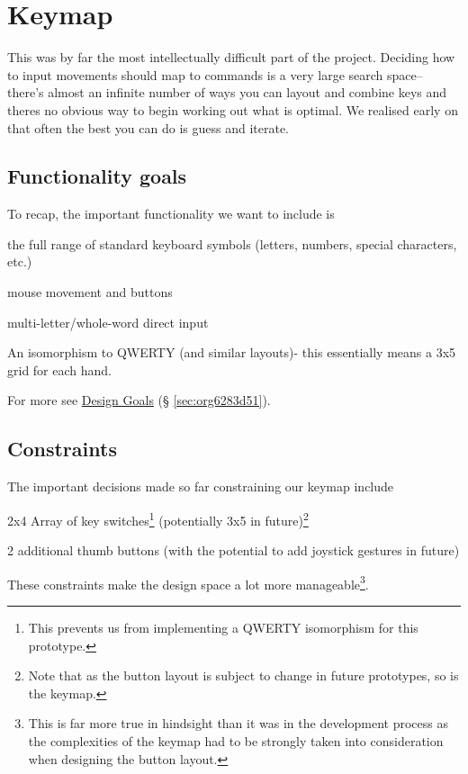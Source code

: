 \documentclass[logo,bsc,singlespacing,parskip]{infthesis}
\begin{document}
\section{Keymap}
\label{sec:org73fc90b}
This was by far the most intellectually difficult part of the project.
Deciding how to input movements should map to commands is a very large search space-- there's almost an infinite number of ways you can layout and combine keys and theres no obvious way to begin working out what is optimal.
We realised early on that often the best you can do is guess and iterate.

\subsection{Functionality goals}
\label{sec:orge45ade3}
To recap, the important functionality we want to include is
\begin{enumerate*}[label={\arabic*)}, itemjoin={, \,}, itemjoin*={, and \,}]
\item the full range of standard keyboard symbols (letters, numbers, special characters, etc.)
\item mouse movement and buttons
\item multi-letter/whole-word direct input
\item An isomorphism to QWERTY (and similar layouts)- this essentially means a 3x5 grid for each hand.
\end{enumerate*}
For more see \hyperref[sec:org6283d51]{Design Goals} (§ \ref{sec:org6283d51}).

\subsection{Constraints}
\label{sec:org8d6a71f}
The important decisions made so far constraining our keymap include
\begin{enumerate*}[label={\arabic*)}, itemjoin={, \,}, itemjoin*={, and \,}]
\item 2x4 Array of key switches\footnote{This prevents us from implementing a QWERTY isomorphism for this prototype.} (potentially 3x5 in future)\footnote{Note that as the button layout is subject to change in future prototypes, so is the keymap.}
\item 2 additional thumb buttons (with the potential to add joystick gestures in future)
\end{enumerate*}
These constraints make the design space a lot more manageable\footnote{This is far more true in hindsight than it was in the development process as the complexities of the keymap had to be strongly taken into consideration when designing the button layout.}.
\end{document}
